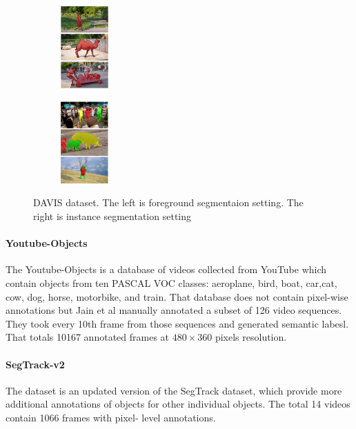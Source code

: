 \begin{figure}[ht]
    \centering
    \begin{subfigure}{}
        \includegraphics[width=0.2\textwidth]{figure/Davis_primary1.png}  
    \end{subfigure}
    \begin{subfigure}{}
        \includegraphics[width=0.2\textwidth]{figure/Davis_instance2.png}
    \end{subfigure}
    \caption{DAVIS dataset. The left is foreground segmentaion setting. The right is instance segmentation setting}
\end{figure}




\paragraph{Youtube-Objects~\cite{Youtube}} 
The Youtube-Objects is a database of videos collected from YouTube which contain objects from ten PASCAL VOC classes: 
aeroplane, bird, boat, car,cat, cow, dog, horse, motorbike, and train.
That database does not contain pixel-wise annotations but Jain et al 
manually annotated a subset of 126 video sequences.
They took every 10th frame from those sequences and generated semantic labesl. 
That totals 10167 annotated frames at $480\times 360$ pixels resolution.

\paragraph{SegTrack-v2~\cite{SegTrack}}
The dataset is an updated version of the SegTrack dataset, which provide more additional
annotations of objects for other individual objects. The total 14 videos contain 1066 frames with pixel-
level annotations. 




